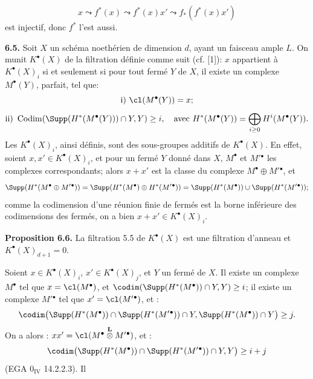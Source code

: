 \[
  x\leadsto f^*(x)\leadsto f^*(x)x'\leadsto f_*(f^*(x)x')
\]
est
injectif, donc $f^*$ l'est aussi.

\textbf{6.5.} Soit $X$ un schéma noethérien de dimension $d$, ayant un faisceau ample $L$. On munit $K^{\bullet}(X)$ de la filtration définie comme suit (cf. [1]): $x$ appartient à $K^{\bullet}(X)_i$ si et seulement si pour tout fermé $Y$ de $X$, il existe un complexe $M^\bullet(Y)$, parfait, tel que:
\[
  \text{i) } \cl(M^\bullet(Y))=x;
\]
\[
  \text{ii) } \operatorname{Codim}(\Supp(H^*(M^\bullet(Y)))\cap Y,Y)\ge i,
  \quad\text{avec } H^*(M^\bullet(Y))=\bigoplus_{i\ge0}H^i(M^\bullet(Y)).
\]
Les $K^{\bullet}(X)_i$, ainsi définis, sont des sous-groupes additifs de $K^{\bullet}(X)$. En effet, soient $x,x'\in K^{\bullet}(X)_i$, et pour un fermé $Y$ donné dans $X$, $M^\bullet$ et $M'{}^\bullet$ les complexes correspondants; alors $x+x'$ est la classe du complexe $M^\bullet\oplus M'{}^\bullet$, et
\[
\Supp(H^*(M^\bullet\oplus M'{}^\bullet))
 =\Supp(H^*(M^\bullet)\oplus H^*(M'{}^\bullet))
 =\Supp(H^*(M^\bullet))\cup\Supp(H^*(M'{}^\bullet));
\]
comme la codimension d'une réunion finie de fermés est la borne inférieure des codimensions des fermés, on a bien $x+x'\in K^{\bullet}(X)_i$.

\textbf{Proposition 6.6.} La filtration 5.5 de $K^{\bullet}(X)$ est une filtration d'anneau et $K^{\bullet}(X)_{d+1}=0$.

Soient $x\in K^{\bullet}(X)_i$, $x'\in K^{\bullet}(X)_j$, et $Y$ un fermé de $X$. Il existe un complexe $M^\bullet$ tel que $x=\cl(M^\bullet)$, et $\codim(\Supp(H^*(M^\bullet))\cap Y,Y)\ge i$; il existe un complexe $M'{}^\bullet$ tel que $x'=\cl(M'{}^\bullet)$, et :
\[
\codim\bigl(\Supp(H^*(M^\bullet))\cap\Supp(H^*(M'{}^\bullet))\cap Y,
            \Supp(H^*(M^\bullet))\cap Y\bigr)\ge j.
\]
On a alors : $xx'=\cl(M^\bullet\overset{\mathbf L}{\otimes}M'{}^\bullet)$, et :
\[
\codim\bigl(\Supp(H^*(M^\bullet))\cap\Supp(H^*(M'{}^\bullet))\cap Y,Y\bigr)\ge i+j
\]
(EGA $0_{\mathrm{IV}}$ 14.2.2.3). Il
